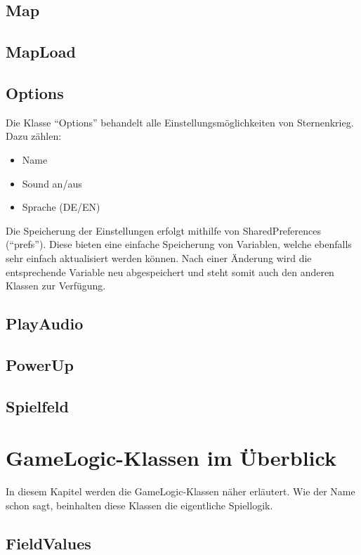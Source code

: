 \documentclass[11pt]{article} %
\begin{document}
\subsection{Map}

\subsection{MapLoad}

\subsection{Options}
Die Klasse \enquote{Options} behandelt alle Einstellungsmöglichkeiten von Sternenkrieg. Dazu zählen:
\begin{itemize}
\item Name
\item Sound an/aus
\item Sprache (DE/EN)
\end{itemize}
Die Speicherung der Einstellungen erfolgt mithilfe von SharedPreferences (\enquote{prefs}). Diese bieten eine einfache Speicherung von Variablen, welche ebenfalls sehr einfach aktualisiert werden können. Nach einer Änderung wird die entsprechende Variable neu abgespeichert und steht somit auch den anderen Klassen zur Verfügung.

\subsection{PlayAudio}

\subsection{PowerUp}

\subsection{Spielfeld}

\section{GameLogic-Klassen im Überblick}
In diesem Kapitel werden die GameLogic-Klassen näher erläutert. Wie der Name schon sagt, beinhalten diese Klassen die eigentliche Spiellogik.

\subsection{FieldValues}
\end{document}
